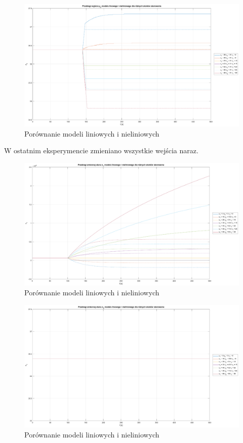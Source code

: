 \begin{figure}[H]
    \centering
    \includegraphics[scale=0.35]{images/y2_u1=20_u2=31_v1=30_dt=0.1.eps}
    \caption{Porównanie modeli liniowych i nieliniowych}
\end{figure}

W ostatnim eksperymencie zmieniano wszystkie wejścia naraz.

\begin{figure}[H]
    \centering
    \includegraphics[scale=0.35]{images/x1_u1=60_u2=93_v1=30_dt=0.1.eps}
    \caption{Porównanie modeli liniowych i nieliniowych}
\end{figure}

\begin{figure}[H]
    \centering
    \includegraphics[scale=0.35]{images/x2_u1=60_u2=93_v1=30_dt=0.1.eps}
    \caption{Porównanie modeli liniowych i nieliniowych}
\end{figure}


